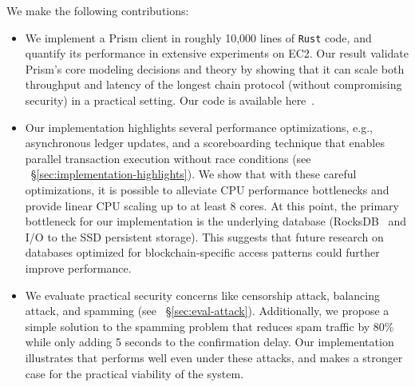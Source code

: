 We make the following contributions:
\begin{itemize}
    \item We implement a Prism client in roughly 10,000 lines of {\tt Rust} code, and quantify its performance in extensive experiments on EC2. Our result validate Prism's core modeling decisions and theory by showing that it can scale both throughput and latency of the longest chain protocol (without compromising security) in a practical setting. Our code is available here~\cite{prismcode}.
    
    \item Our implementation highlights several performance optimizations, e.g., asynchronous ledger updates, and a scoreboarding technique that enables parallel transaction execution without race conditions (see ~\S\ref{sec:implementation-highlights}). We show that with these careful optimizations, it is possible to alleviate CPU performance bottlenecks and provide linear CPU scaling up to at least 8 cores. At this point, the primary bottleneck for our implementation is the underlying database (RocksDB~\cite{rocksdb} and I/O to the SSD persistent storage). This suggests that future research on databases optimized for blockchain-specific access patterns could further improve performance. 
    
    \item We evaluate practical security concerns like censorship attack, balancing attack, and spamming (see ~\S\ref{sec:eval-attack}). Additionally, we propose a simple solution to the spamming problem that reduces spam traffic by 80\% while only adding 5 seconds to the confirmation delay. Our implementation illustrates that \prism performs well even under these attacks, and makes a stronger case for the practical viability of the system.
    
\end{itemize}




